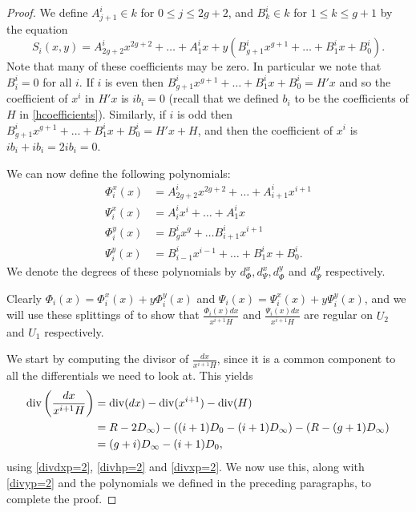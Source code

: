 \begin{proof}
We define $A^i_{j+1} \in k$ for $0 \leq j \leq 2g+2$, and $B_k^i \in k$ for $1\leq k \leq g+1$ by the equation
\[
S_i(x,y) = A_{2g+2}^ix^{2g+2} + \ldots + A^i_1 x + y(B_{g+1}^i x^{g+1} + \ldots + B_1^i x + B_0^i).
\]
Note that many of these coefficients may be zero.
In particular we note that $B_i^i = 0$ for all $i$.
If $i$ is even then $B_{g+1}^ix^{g+1} + \ldots + B_1^ix + B_0^i = H'x$ and so the coefficient of $x^i$ in $H'x$ is $ib_i = 0$ (recall that we defined $b_i$ to be the coefficients of $H$ in \eqref{hcoefficients}).
Similarly, if $i$ is odd then $B_{g+1}^ix^{g+1} + \ldots + B_1^ix + B_0^i = H'x + H$, and then the coefficient of $x^i$ is $ib_i+ ib_i = 2ib_i = 0$.


We can now define the following polynomials:
\begin{equation}\label{Split}
\begin{split}
\Phi_i^x(x) & =  A^i_{2g+2}x^{2g+2} + \ldots + A^i_{i+1}x^{i+1} \\
\Psi_i^x(x) & =  A^i_ix^i + \ldots + A^i_1x \\
\Phi_i^y(x) & =  B_g^ix^g + \ldots B_{i+1}^ix^{i+1} \\
\Psi_i^y(x) & =  B_{i-1}^ix^{i-1} + \ldots + B_1^ix + B_0^i.
\end{split}
\end{equation}
We denote the degrees of these polynomials by $d_{\Phi}^x, d_{\Psi}^x, d_{\Phi}^y$ and $d_{\Psi}^y$ respectively.

Clearly $\Phi_i(x) = \Phi_i^x(x) + y\Phi_i^y(x)$ and $\Psi_i (x)= \Psi_i^x(x) + y\Psi_i^y(x)$, and we will use these splittings of to show that $\frac{ \Phi_i(x) dx}{x^{i+1}H}$ and $\frac{\Psi_i(x) dx}{x^{i+1}H}$ are regular on $U_2$ and $U_1$ respectively.

We start by computing the divisor of $\frac{dx}{x^{i+1}H}$, since it is a common component to all the differentials we need to look at.
This yields
\begin{align}
\operatorname{div} \left( \frac{dx}{x^{i+1}H} \right) & = \operatorname{div}(dx) - \operatorname{div} (x^{i+1}) - \operatorname{div} (H) \nonumber \\
& = R-2D_\infty) - ((i+1)D_0 - (i+1)D_\infty) - (R - (g+1)D_\infty) \nonumber \\
& = (g+i)D_\infty - (i+1)D_0,
\end{align}
using \eqref{divdxp=2}, \eqref{divhp=2} and \eqref{divxp=2}.
We now use this, along with \eqref{divyp=2} and the polynomials we defined in the preceding paragraphs, to complete the proof.


\end{proof}
